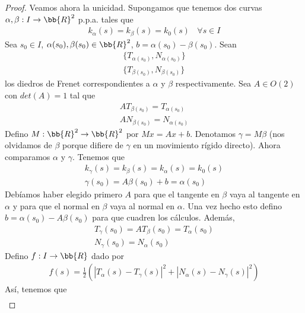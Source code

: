 \begin{teo}
\begin{proof}

        Veamos ahora la unicidad. Supongamos que tenemos dos curvas $\alpha, \beta : I \to \bb{R}^2$ p.p.a. tales que 
        \begin{gather*}
            k_\alpha(s) = k_\beta(s) = k_0(s)\ \ \ \ \forall s \in I
        \end{gather*}
        Sea $s_0\in I$, $\alpha(s_0),\beta(s_0)\in \bb{R}^2$, $b=\alpha(s_0)-\beta(s_0)$. Sean 
        \begin{gather*}
            \{T_{\alpha(s_0)}, N_{\alpha(s_0)}\}\\
            \{T_{\beta(s_0)}, N_{\beta(s_0)}\}
        \end{gather*}
        los diedros de Frenet correspondientes a $\alpha$ y $\beta$ respectivamente. Sea $A\in O(2)$ con $det(A)=1$ tal que 
        \begin{gather*}
            AT_{\beta(s_0)} = T_{\alpha(s_0)}\\
            AN_{\beta(s_0)} = N_{\alpha(s_0)}
        \end{gather*}
        Defino $M:\bb{R}^2\to \bb{R}^2$ por $Mx=Ax+b$. Denotamos $\gamma = M\beta$ (nos olvidamos de $\beta$ porque difiere de $\gamma$ en un movimiento rígido directo). Ahora comparamos $\alpha$ y $\gamma$. Tenemos que 
        \begin{gather*}
            k_\gamma(s) = k_\beta(s) = k_\alpha(s) = k_0(s)\\
            \gamma(s_0) = A\beta(s_0) + b = \alpha(s_0)
        \end{gather*}
        Debíamos haber elegido primero $A$ para que el tangente en $\beta$ vaya al tangente en $\alpha$ y para que el normal en $\beta$ vaya al normal en $\alpha$. Una vez hecho esto defino $b=\alpha(s_0) - A\beta(s_0)$ para que cuadren los cálculos. Además, 
        \begin{gather*}
            T_\gamma(s_0) = AT_\beta(s_0) = T_\alpha(s_0)\\
            N_\gamma(s_0) = N_\alpha(s_0)
        \end{gather*}
        Defino $f:I\to \bb{R}$ dado por 
        \begin{gather*}
            f(s) = \frac{1}{2}(|T_\alpha(s)-T_\gamma(s)|^2 + |N_\alpha(s)-N_\gamma(s)|^2)
        \end{gather*}
        Así, tenemos que 
        \begin{align*}

\end{align*}
\end{proof}
\end{teo}

